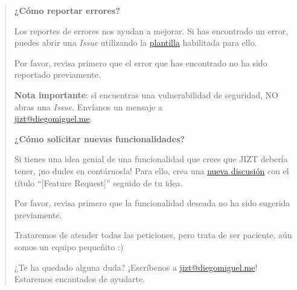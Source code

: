 \begin{quote}
	\medskip
	\textbf{¿Cómo reportar errores?}
	
	Los reportes de errores nos ayudan a mejorar. Si has encontrado un error,
	puedes abrir una \emph{Issue} utilizando la
	\href{https://github.com/dmlls/jizt/issues/new?assignees=&labels=bug&template=reportar-error.md\&title=}{plantilla}	habilitada para ello.
	
	Por favor, revisa primero que el error que has encontrado no ha sido
	reportado previamente.
	
	\smallskip
	\textbf{Nota importante}: si encuentras una vulnerabilidad de seguridad, NO
	abras una \emph{Issue}. Envíanos un mensaje a \\ \href{mailto:jizt@diegomiguel.me}{jizt@diegomiguel.me}.
	
	\medskip
	\textbf{¿Cómo solicitar nuevas funcionalidades?}
	
	Si tienes una idea genial de una funcionalidad que crees que JIZT debería tener, ¡no dudes en contárnosla! Para ello, crea una \href{https://github.com/dmlls/jizt/discussions/new}{nueva discusión} con el título ``[Feature Request]'' seguido de tu idea.
	
	Por favor, revisa primero que la funcionalidad deseada no ha sido sugerida
	previamente.
	
	Trataremos de atender todas las peticiones, pero trata de ser paciente,
	aún somos un equipo pequeñito :)
	
	¿Te ha quedado alguna duda? ¡Escríbenos a
	\href{mailto:jizt@diegomiguel.me}{jizt@diegomiguel.me}! Estaremos encantados de	ayudarte.
\end{quote}